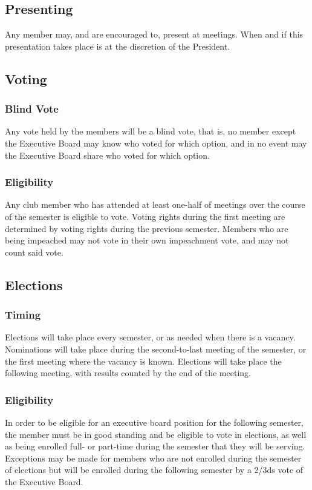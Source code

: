 \documentclass{article}
\begin{document}
\subsection{Presenting}
Any member may, and are encouraged to, present at meetings.  When and if this presentation takes place is at the discretion of the President.
\subsection{Voting}\label{Voting}
\subsubsection{Blind Vote}
Any vote held by the members will be a blind vote, that is, no member except the Executive Board may know who voted for which option, and in no event may the Executive Board share who voted for which option.
\subsubsection{Eligibility}
Any club member who has attended at least one-half of meetings over the course of the semester is eligible to vote.  Voting rights during the first meeting are determined by voting rights during the previous semester.  Members who are being impeached may not vote in their own impeachment vote, and may not count said vote.
\subsection{Elections}
\subsubsection{Timing}
Elections will take place every semester, or as needed when there is a vacancy.  Nominations will take place during the second-to-last meeting of the semester, or the first meeting where the vacancy is known.  Elections will take place the following meeting, with results counted by the end of the meeting.
\subsubsection{Eligibility}
In order to be eligible for an executive board position for the following semester, the member must be in good standing and be eligible to vote in elections, as well as being enrolled full- or part-time during the semester that they will be serving.  Exceptions may be made for members who are not enrolled during the semester of elections but will be enrolled during the following semester by a 2/3ds vote of the Executive Board.
\end{document}
